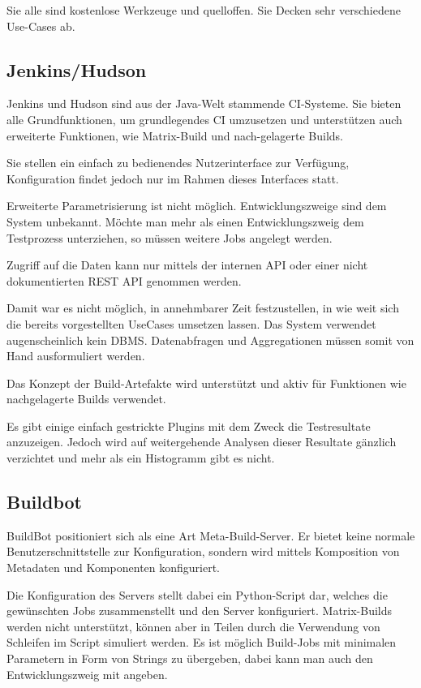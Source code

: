 Sie alle sind kostenlose Werkzeuge und quelloffen.
Sie Decken sehr verschiedene Use-Cases ab.

\subsection{Jenkins/Hudson}

Jenkins und Hudson sind aus der Java-Welt  stammende \ac{CI}-Systeme.
Sie bieten alle Grundfunktionen, um grundlegendes \ac{CI} umzusetzen
und unterst\"utzen auch erweiterte Funktionen,
wie Matrix-Build und nach-gelagerte Builds.

Sie stellen ein einfach zu bedienendes Nutzerinterface zur Verfügung,
Konfiguration findet jedoch nur im Rahmen dieses Interfaces statt.

Erweiterte Parametrisierung ist nicht m\"oglich.
Entwicklungszweige sind dem System unbekannt.
M\"ochte man mehr als einen Entwicklungszweig dem Testprozess unterziehen,
so m\"ussen weitere Jobs angelegt werden.

Zugriff auf die Daten kann nur mittels der internen \ac{API} oder
einer nicht dokumentierten \ac{REST} \ac{API} genommen werden.

Damit war es nicht m\"oglich, in annehmbarer Zeit festzustellen,
in wie weit sich die bereits vorgestellten UseCases umsetzen lassen.
Das System verwendet augenscheinlich kein \ac{DBMS}.
Datenabfragen und Aggregationen m\"ussen
somit von Hand ausformuliert werden.

Das Konzept der Build-Artefakte wird unterst\"utzt und
aktiv f\"ur Funktionen wie nachgelagerte Builds verwendet.

Es gibt einige einfach gestrickte Plugins mit dem Zweck die Testresultate anzuzeigen.
Jedoch wird auf weitergehende Analysen dieser Resultate g\"anzlich verzichtet
und mehr als ein Histogramm gibt es nicht.


\subsection{Buildbot}


BuildBot \cite{buildbot:website} positioniert sich als eine Art Meta-Build-Server.
Er bietet keine normale Benutzerschnittstelle zur Konfiguration,
sondern wird mittels Komposition von Metadaten und Komponenten konfiguriert.

Die Konfiguration des Servers stellt dabei ein Python-Script dar,
welches die gewünschten Jobs zusammenstellt und den Server konfiguriert.
Matrix-Builds werden nicht unterst\"utzt,
k\"onnen aber in Teilen durch die Verwendung von Schleifen im Script simuliert werden.
Es ist möglich Build-Jobs mit minimalen Parametern in Form von Strings zu \"ubergeben,
dabei kann man auch den Entwicklungszweig mit angeben.

